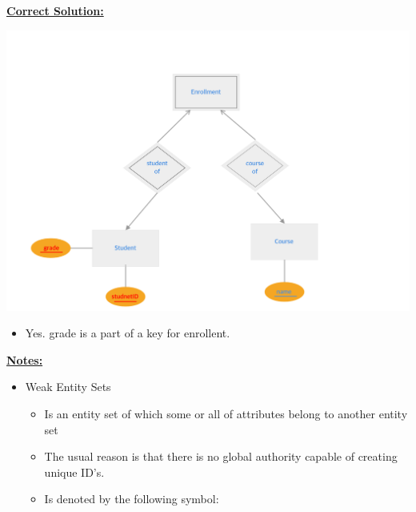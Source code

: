 \documentclass[12pt]{article}
\begin{document}
\begin{enumerate}[1.]
    \bigskip


    \begin{mdframed}

        \underline{\textbf{Correct Solution:}}

        \bigskip

        \begin{center}
        \includegraphics[width=\linewidth]{images/worksheet_14_solution_57.png}
        \end{center}

        \bigskip

        \color{red}
        \begin{itemize}
            \item Yes. grade is a part of a key for enrollent.
        \end{itemize}
        \color{black}
    \end{mdframed}

    \bigskip

    \underline{\textbf{Notes:}}

    \bigskip

    \begin{itemize}
        \item Weak Entity Sets
        \begin{itemize}
            \item Is an entity set of which some or all of attributes belong to
            another entity set
            \item The usual reason is that there is no global authority capable of creating unique ID’s.
            \item Is denoted by the following symbol:


\end{itemize}
\end{itemize}
\end{enumerate}
\end{document}
